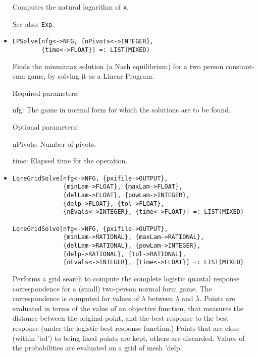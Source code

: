 \begin{itemize}
\bd
Computes the natural logarithm of \verb+x+.
\item
[See also:] {\tt Exp}.
\ed

\item
\protect \large \begin{verbatim}
LPSolve[nfg<->NFG, {nPivots<->INTEGER},
        {time<->FLOAT}] =: LIST(MIXED)
\end{verbatim}\normalsize

\bd
Finds the minmimax solution (a Nash equilibrium) for a
two person constant-sum game, by solving it as a Linear Program.
\item
[Required parameters:]
\bd
\item
[nfg:] The game in normal form for which the solutions are to be found.  
\ed

\item
[Optional parameters:]\hfil\null

\bd
\item[nPivots:] Number of pivots. 
\item[time:] Elapsed time for the operation.
\ed
\ed

\item
\protect \large \begin{verbatim}
LqreGridSolve[nfg<->NFG, {pxifile->OUTPUT},
              {minLam->FLOAT}, {maxLam->FLOAT}, 
              {delLam->FLOAT}, {powLam->INTEGER}, 
              {delp->FLOAT}, {tol->FLOAT},
              {nEvals<->INTEGER}, {time<->FLOAT}] =: LIST(MIXED)

LqreGridSolve[nfg<->NFG, {pxifile->OUTPUT},
              {minLam->RATIONAL}, {maxLam->RATIONAL}, 
              {delLam->RATIONAL}, {powLam->INTEGER}, 
              {delp->RATIONAL}, {tol->RATIONAL},
              {nEvals<->INTEGER}, {time<->FLOAT}] =: LIST(MIXED)
\end{verbatim}\normalsize

\bd
Performs a grid search to compute the complete logistic
quantal response correspondence for a (small) two-person normal form
game.  The correspondence is computed for values of $\lambda$ between
$\underline{\lambda}$ and $\bar{\lambda}.$ Points are evaluated in
terms of the value of an objective function, that measures the
distance between the original point, and the best response to the best
response (under the logistic best response function.)  Points that are
close (within 'tol') to being fixed points are kept, others are
discarded.  Values of the probabilities are evaluated on a grid of
mesh 'delp.'


\end{itemize}
